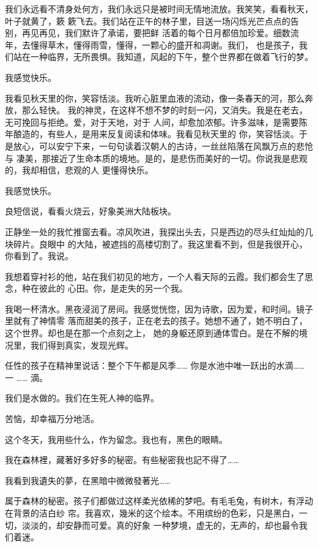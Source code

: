 \documentclass[12pt,a4paper]{article}
\begin{document}
		我们永远看不清身处何方，我们永远只是被时间无情地流放。我笑笑，看看秋天，叶子就黄了，簌
	簌飞去。我们站在正午的林子里，目送一场闪烁光芒点点的告别，再见再见，我们默许了承诺，要把鲜
	活着的每个日月都倍加珍爱。细数流年，去懂得草木，懂得雨雪，懂得，一颗心的盛开和凋谢。我们，
	也是孩子，我们站在一种临界，无所畏惧。我知道，风起的下午，整个世界都在做着飞行的梦。

		我感觉快乐。

		我看见秋天里的你，笑容恬淡。我听心脏里血液的流动，像一条春天的河，那么奔放，那么轻快。
	我的神灵，在这样不想不梦的时刻一闪，又消失。我是在老去，无可挽回与拒绝。爱，对于天地，对于
	人间，却愈加浓郁。许多滋味，是需要陈年酿造的，有些人，是用来反复阅读和体味。我看见秋天里的
	你，笑容恬淡。于是放心，可以安宁下来，一句句读着汉朝人的古诗，一丝丝陷落在风飘万点的悲怆与
	凄美，那接近了生命本质的境地。是的，是悲伤而美好的一切。你说我是悲观的，我却相信，悲观的人
	更懂得快乐。

		我感觉快乐。

		良短信说，看看火烧云，好象美洲大陆板块。

		正静坐一处的我忙推窗去看。凉风吹进，我探出头去，只是西边的尽头红灿灿的几块碎片。良眼中
	的大陆，被遮挡的高楼切割了。我这里看不到，但是我很开心，你看到了。我说。

		我想着穿衬衫的他，站在我们初见的地方，一个人看天际的云霞。我们都会生了思念，种在彼此的
	心田。你，是走失的另一个我。

		我喝一杯清水。黑夜浸润了房间。我感觉恍惚，因为诗歌，因为爱，和时间。镜子里就有了神情零
	落而甜美的孩子，正在老去的孩子。她想不通了，她不明白了，这个世界。却也是在那一个点刻之上，
	她的身躯还原到通体雪白。是在不解的境况里，我们得到真实，发现光辉。

		任性的孩子在精神里说话：整个下午都是风季…… 你是水池中唯一跃出的水滴…… 一 …… 滴。

		我们是水做的。我们在生死人神的临界。

		苦恼，却幸福万分地活。

		这个冬天，我用些什么，作为留念。我也有，黑色的眼睛。

	\endwriting



		我在森林裡，藏著好多好多的秘密。有些秘密我也記不得了……

		我看到我遺失的夢，在黑暗中微微發著光……


		属于森林的秘密。孩子们都做过这样柔光依稀的梦吧。有毛毛兔，有树木，有浮动在背景的洁白纱
	帘。我喜欢，幾米的这个绘本。不用缤纷的色彩，只是黑白，一切，淡淡的，却安静而可爱。真的好象
	一种梦境，虚无的，无声的，却也最令我们着迷。
\end{document}

